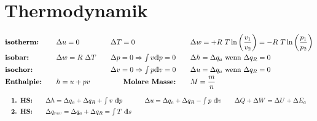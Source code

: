 
\section{Thermodynamik}
%
	\skipabove{-15pt}
		\[ \arraycolsep=0em %
		\begin{array}{l p{2em} l p{2em} l p{2em} l}
			\textbf{isotherm:}  && \Delta u=0           && \Delta T=0                               && \Delta w = + R\ T  \ln \left(\dfrac{v_1}{v_2} \right) = - R\ T \ln \left(\dfrac{p_1}{p_2}\right) \\
			\textbf{isobar:}    && \Delta w=R\ \Delta T && \Delta p=0 \Rightarrow \int{}v\dd p=0    && \Delta h = \Delta q_a \text{ wenn } \Delta q_R = 0                                                 \\
			\textbf{isochor:}   &&                      && \Delta v=0 \Rightarrow \int p\dd v=0     && \Delta u = \Delta q_a \text{ wenn } \Delta q_R = 0                                                 \\
			\textbf{Enthalpie:} && h=u+pv               && \multicolumn{1}{r}{\textbf{Molare Masse:}} && M = \dfrac{m}{n}
		\end{array} \]
	\skipabove{-10pt}
		\[ \arraycolsep=1em  \def\arraystretch{1.4}
		\begin{array}{llll}
			\textbf{1. HS:} & \Delta h = \Delta q_a + \Delta q_R + \int v\ \dd p    & \Delta u = \Delta q_a + \Delta q_R - \int p\ \dd v & \Delta Q + \Delta W = \Delta U + \Delta E_a \\
			\textbf{2. HS:} & \Delta q_{rev}=\Delta q_a + \Delta q_R= \int T\ \dd s &                                                    &
		\end{array} \]

